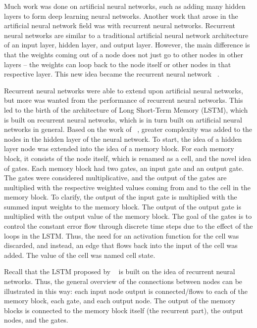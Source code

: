 \documentclass[11pt,letterpaper]{article}
\begin{document}
	Much work was done on artificial neural networks, such as adding many hidden layers to form deep learning neural networks. Another work that arose in the artificial neural network field was with recurrent neural networks. Recurrent neural networks are similar to a traditional artificial neural network architecture of an input layer, hidden layer, and output layer. However, the main difference is that the weights coming out of a node does not just go to other nodes in other layers -- the weights can loop back to the node itself or other nodes in that respective layer. This new idea became the recurrent neural network ~\cite{Elman:90}.

	Recurrent neural networks were able to extend upon artificial neural networks, but more was wanted from the performance of recurrent neural networks. This led to the birth of the architecture of Long Short-Term Memory (LSTM), which is built on recurrent neural networks, which is in turn built on artificial neural networks in general. Based on the work of ~\cite{Hochreiter:97}, greater complexity was added to the nodes in the hidden layer of the neural network. To start, the idea of a hidden layer node was extended into the idea of a memory block. For each memory block, it consists of the node itself, which is renamed as a cell, and the novel idea of gates. Each memory block had two gates, an input gate and an output gate. The gates were considered multiplicative, and the output of the gates are multiplied with the respective weighted values coming from and to the cell in the memory block. To clarify, the output of the input gate is multiplied with the summed input weights to the memory block. The output of the output gate is multiplied with the output value of the memory block. The goal of the gates is to control the constant error flow through discrete time steps due to the effect of the loops in the LSTM. Thus, the need for an activation function for the cell was discarded, and instead, an edge that flows back into the input of the cell was added. The value of the cell was named cell state.

	Recall that the LSTM proposed by ~\cite{Hochreiter:97} is built on the idea of recurrent neural networks. Thus, the general overview of the connections between nodes can be illustrated in this way: each input node output is connected/flows to each of the memory block, each gate, and each output node. The output of the memory blocks is connected to the memory block itself (the recurrent part), the output nodes, and the gates.
\end{document}
